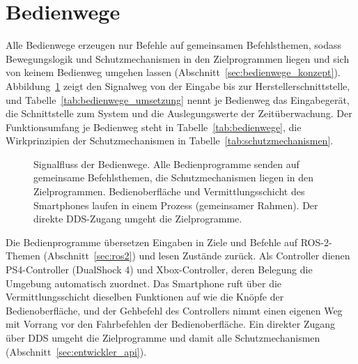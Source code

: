 \section{Bedienwege}
\label{sec:bedienwege}
Alle Bedienwege erzeugen nur Befehle auf gemeinsamen Befehlsthemen, sodass Bewegungslogik und Schutzmechanismen in den Zielprogrammen liegen und sich von keinem Bedienweg umgehen lassen (Abschnitt~\ref{sec:bedienwege_konzept}).
Abbildung~\ref{fig:bedienwege_signal} zeigt den Signalweg von der Eingabe bis zur Herstellerschnittstelle, und Tabelle~\ref{tab:bedienwege_umsetzung} nennt je Bedienweg das Eingabegerät, die Schnittstelle zum System und die Auslegungswerte der Zeitüberwachung.
Der Funktionsumfang je Bedienweg steht in Tabelle~\ref{tab:bedienwege}, die Wirkprinzipien der Schutzmechanismen in Tabelle~\ref{tab:schutzmechanismen}.

\begin{figure}[htbp]
  \centering
  
  \caption[Signalfluss der Bedienwege]{Signalfluss der Bedienwege. Alle Bedienprogramme senden auf gemeinsame Befehlsthemen, die Schutzmechanismen liegen in den Zielprogrammen. Bedienoberfläche und Vermittlungsschicht des Smartphones laufen in einem Prozess (gemeinsamer Rahmen). Der direkte \acs{DDS}-Zugang umgeht die Zielprogramme.}
  \label{fig:bedienwege_signal}
\end{figure}

Die Bedienprogramme übersetzen Eingaben in Ziele und Befehle auf ROS-2-Themen (Abschnitt~\ref{sec:ros2}) und lesen Zustände zurück.
Als Controller dienen PS4-Controller (DualShock 4) und Xbox-Controller, deren Belegung die Umgebung automatisch zuordnet.
Das Smartphone ruft über die Vermittlungsschicht dieselben Funktionen auf wie die Knöpfe der Bedienoberfläche, und der Gehbefehl des Controllers nimmt einen eigenen Weg mit Vorrang vor den Fahrbefehlen der Bedienoberfläche.
Ein direkter Zugang über \ac{DDS} umgeht die Zielprogramme und damit alle Schutzmechanismen (Abschnitt~\ref{sec:entwickler_api}).

